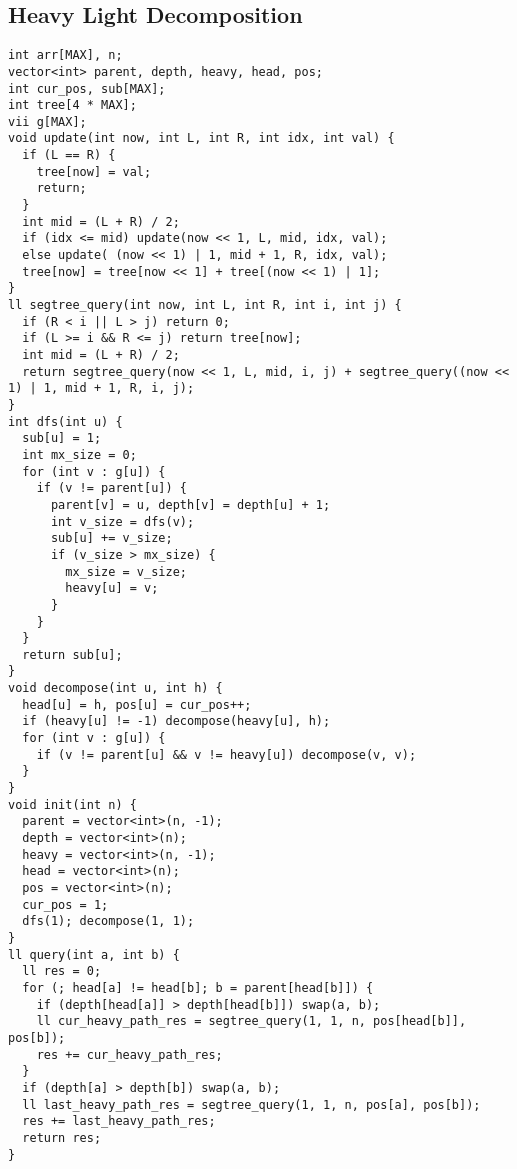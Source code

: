 \documentclass[10pt,a4paper,onesided]{article}
\begin{document}
\begin{multicols*}{3}
\subsection{Heavy Light Decomposition}
\begin{lstlisting}
int arr[MAX], n;
vector<int> parent, depth, heavy, head, pos;
int cur_pos, sub[MAX];
int tree[4 * MAX];
vii g[MAX];
void update(int now, int L, int R, int idx, int val) {
  if (L == R) {
    tree[now] = val;
    return;
  }
  int mid = (L + R) / 2;
  if (idx <= mid) update(now << 1, L, mid, idx, val);
  else update( (now << 1) | 1, mid + 1, R, idx, val);
  tree[now] = tree[now << 1] + tree[(now << 1) | 1];
}
ll segtree_query(int now, int L, int R, int i, int j) {
  if (R < i || L > j) return 0;
  if (L >= i && R <= j) return tree[now];
  int mid = (L + R) / 2;
  return segtree_query(now << 1, L, mid, i, j) + segtree_query((now << 1) | 1, mid + 1, R, i, j);
}
int dfs(int u) {
  sub[u] = 1;
  int mx_size = 0;
  for (int v : g[u]) {
    if (v != parent[u]) {
      parent[v] = u, depth[v] = depth[u] + 1;
      int v_size = dfs(v);
      sub[u] += v_size;
      if (v_size > mx_size) {
        mx_size = v_size;
        heavy[u] = v;
      }
    }
  }
  return sub[u];
}
void decompose(int u, int h) {
  head[u] = h, pos[u] = cur_pos++;
  if (heavy[u] != -1) decompose(heavy[u], h);
  for (int v : g[u]) {
    if (v != parent[u] && v != heavy[u]) decompose(v, v);
  }
}
void init(int n) {
  parent = vector<int>(n, -1);
  depth = vector<int>(n);
  heavy = vector<int>(n, -1);
  head = vector<int>(n);
  pos = vector<int>(n);
  cur_pos = 1;
  dfs(1); decompose(1, 1);
}
ll query(int a, int b) {
  ll res = 0;
  for (; head[a] != head[b]; b = parent[head[b]]) {
    if (depth[head[a]] > depth[head[b]]) swap(a, b);
    ll cur_heavy_path_res = segtree_query(1, 1, n, pos[head[b]], pos[b]);
    res += cur_heavy_path_res;
  }
  if (depth[a] > depth[b]) swap(a, b);
  ll last_heavy_path_res = segtree_query(1, 1, n, pos[a], pos[b]);
  res += last_heavy_path_res;
  return res;
}
\end{lstlisting}

\end{multicols*}
\end{document}

